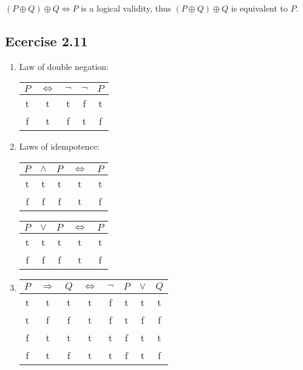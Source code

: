 \documentclass[leqno]{article}
\renewcommand{\iff}{\Leftrightarrow}
\newcommand{\xor}{\oplus}
\renewcommand{\implies}{\Rightarrow}
\begin{document}
$(P \xor Q) \xor Q \iff P$ is a logical validity, thus $(P \xor Q) \xor Q$ is equivalent to $P$.

\subsection*{Ecercise 2.11}
\begin{enumerate}
\item Law of double negation:

\begin{tabular}{ccccc}
  \hline
  $P$ & $\iff$ & $\neg$ & $\neg$ & $P$ \\
  \hline
   t  &    t   &    t   &    f   &  t  \\
   f  &    t   &    f   &    t   &  f  \\
  \hline
\end{tabular}

\item Laws of idempotence:

\begin{tabular}{ccccc}
  \hline
  $P$ & $\land$ & $P$ & $\iff$ & $P$ \\
  \hline
   t  &    t    &  t  &    t   &  t  \\
   f  &    f    &  f  &    t   &  f  \\
  \hline
\end{tabular}
\quad
\begin{tabular}{ccccc}
  \hline
  $P$ & $\lor$ & $P$ & $\iff$ & $P$ \\
  \hline
   t  &    t    &  t  &    t   &  t  \\
   f  &    f    &  f  &    t   &  f  \\
  \hline
\end{tabular}

\item
\begin{tabular}{cccccccc}
  \hline
  $P$ & $\implies$ & $Q$ & $\iff$ & $\neg$ & $P$ & $\lor$ & $Q$ \\
  \hline
   t  &      t     &  t  &    t   &    f   &  t  &    t   &  t  \\
   t  &      f     &  f  &    t   &    f   &  t  &    f   &  f  \\
   f  &      t     &  t  &    t   &    t   &  f  &    t   &  t  \\
   f  &      t     &  f  &    t   &    t   &  f  &    t   &  f  \\
  \hline
\end{tabular}


\end{enumerate}
\end{document}
